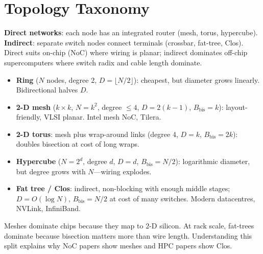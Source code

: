 \section{Topology Taxonomy}
\textbf{Direct networks}: each node has an integrated router (mesh, torus, hypercube).
\textbf{Indirect}: separate switch nodes connect terminals (crossbar, fat-tree, Clos).
Direct suits on-chip (NoC) where wiring is planar; indirect dominates off-chip
supercomputers where switch radix and cable length dominate.

\begin{itemize}[leftmargin=1.2em, itemsep=0.2em]
\item \textbf{Ring} ($N$ nodes, degree 2, $D=\lfloor N/2\rfloor$): cheapest, but diameter grows linearly. Bidirectional halves $D$.
\item \textbf{2-D mesh} ($k\times k$, $N=k^2$, degree $\le4$, $D=2(k-1)$, $B_{\text{bis}}=k$): layout-friendly, VLSI planar. Intel mesh NoC, Tilera.
\item \textbf{2-D torus}: mesh plus wrap-around links (degree 4, $D=k$, $B_{\text{bis}}=2k$): doubles bisection at cost of long wraps.
\item \textbf{Hypercube} ($N=2^d$, degree $d$, $D=d$, $B_{\text{bis}}=N/2$): logarithmic diameter, but degree grows with $N$---wiring explodes.
\item \textbf{Fat tree / Clos}: indirect, non-blocking with enough middle stages; $D=O(\log N)$, $B_{\text{bis}}=N/2$ at cost of many switches. Modern datacentres, NVLink, InfiniBand.
\end{itemize}
Meshes dominate chips because they map to 2-D silicon. At rack scale, fat-trees dominate
because bisection matters more than wire length. Understanding this split explains why
NoC papers show meshes and HPC papers show Clos.

